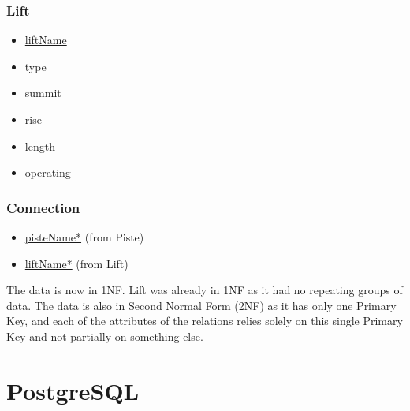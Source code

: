 \documentclass[11pt]{scrartcl} %
\newenvironment{myitemize}
{ \begin{itemize}[]
    \setlength{\itemsep}{0pt}
    \setlength{\parskip}{0pt}
    \setlength{\parsep}{0pt}     }
{ \end{itemize}                  }
\begin{document}
\subsubsection{Lift}
\begin{myitemize}
\item\underline{liftName}
\item type
\item summit
\item rise
\item length
\item operating
\end{myitemize}
\subsubsection{Connection}
\begin{myitemize}
\item \underline{pisteName*} (from Piste)
\item \underline{liftName*} (from Lift)
\end{myitemize}

The data is now in 1NF. Lift was already in 1NF as it had no repeating groups of data. The data is also in Second Normal Form (2NF) as it has only one Primary Key, and each of the attributes of the relations relies solely on this single Primary Key and not partially on something else.
\section{PostgreSQL}
\end{document}
